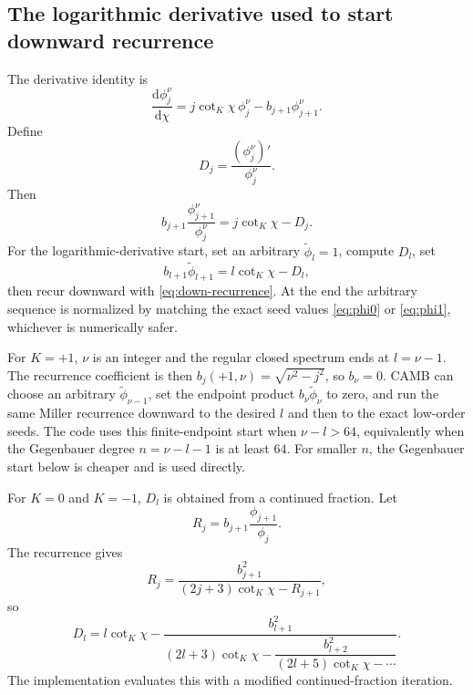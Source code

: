 \documentclass[11pt,a4paper]{article}
\newcommand{\dd}{\mathrm{d}}
\newcommand{\cotK}{\cot_K}
\begin{document}
\subsection{The logarithmic derivative used to start downward recurrence}

The derivative identity is
\begin{equation}
  \frac{\dd\phi_j^\nu}{\dd\chi}
  =j\cotK\chi\,\phi_j^\nu-b_{j+1}\phi_{j+1}^\nu.
  \label{eq:deriv-id}
\end{equation}
Define
\begin{equation}
  D_j=\frac{(\phi_j^\nu)'}{\phi_j^\nu}.
\end{equation}
Then
\begin{equation}
  b_{j+1}\frac{\phi_{j+1}^\nu}{\phi_j^\nu}=j\cotK\chi-D_j.
  \label{eq:ratio-logderiv}
\end{equation}
For the logarithmic-derivative start, set an arbitrary \(\widetilde\phi_l=1\), compute \(D_l\), set
\begin{equation}
  b_{l+1}\widetilde\phi_{l+1}=l\cotK\chi-D_l,
  \label{eq:miller-start}
\end{equation}
then recur downward with \eqref{eq:down-recurrence}.  At the end the arbitrary sequence is normalized by matching the exact seed values \eqref{eq:phi0} or \eqref{eq:phi1}, whichever is numerically safer.

For \(K=+1\), \(\nu\) is an integer and the regular closed spectrum ends at \(l=\nu-1\).  The recurrence coefficient is then \(b_j(+1,\nu)=\sqrt{\nu^2-j^2}\), so \(b_\nu=0\).  CAMB can choose an arbitrary \(\widetilde\phi_{\nu-1}\), set the endpoint product \(b_\nu\widetilde\phi_\nu\) to zero, and run the same Miller recurrence downward to the desired \(l\) and then to the exact low-order seeds.  The code uses this finite-endpoint start when \(\nu-l>64\), equivalently when the Gegenbauer degree \(n=\nu-l-1\) is at least \(64\).  For smaller \(n\), the Gegenbauer start below is cheaper and is used directly.

For \(K=0\) and \(K=-1\), \(D_l\) is obtained from a continued fraction.  Let
\begin{equation}
  R_j=b_{j+1}\frac{\phi_{j+1}}{\phi_j}.
\end{equation}
The recurrence gives
\begin{equation}
  R_j=\frac{b_{j+1}^2}{(2j+3)\cotK\chi-R_{j+1}},
\end{equation}
so
\begin{equation}
  D_l=l\cotK\chi-
  \frac{b_{l+1}^2}{(2l+3)\cotK\chi-
  \dfrac{b_{l+2}^2}{(2l+5)\cotK\chi-\cdots}}.
  \label{eq:cf-logderiv}
\end{equation}
The implementation evaluates this with a modified continued-fraction iteration.
\end{document}
